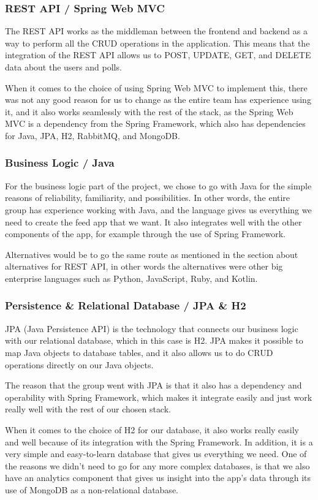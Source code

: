 \subsubsection{REST API / Spring Web MVC}
The REST API works as the middleman between the frontend and backend as a way to perform all the CRUD operations in the application. This means that the integration of the REST API allows us to POST, UPDATE, GET, and DELETE data about the users and polls.

When it comes to the choice of using Spring Web MVC to implement this, there was not any good reason for us to change as the entire team has experience using it, and it also works seamlessly with the rest of the stack, as the Spring Web MVC is a dependency from the Spring Framework, which also has dependencies for Java, JPA, H2, RabbitMQ, and MongoDB. 

\subsubsection{Business Logic / Java}
For the business logic part of the project, we chose to go with Java for the simple reasons of reliability, familiarity, and possibilities. In other words, the entire group has experience working with Java, and the language gives us everything we need to create the feed app that we want. It also integrates well with the other components of the app, for example through the use of Spring Framework.

Alternatives would be to go the same route as mentioned in the section about alternatives for REST API, in other words the alternatives were other big enterprise languages such as Python, JavaScript, Ruby, and Kotlin. 

\subsubsection{Persistence \& Relational Database / JPA \& H2}
JPA (Java Persistence API) is the technology that connects our business logic with our relational database, which in this case is H2. JPA makes it possible to map Java objects to database tables, and it also allows us to do CRUD operations directly on our Java objects. 

The reason that the group went with JPA is that it also has a dependency and operability with Spring Framework, which makes it integrate easily and just work really well with the rest of our chosen stack.

When it comes to the choice of H2 for our database, it also works really easily and well because of its integration with the Spring Framework. In addition, it is a very simple and easy-to-learn database that gives us everything we need. One of the reasons we didn't need to go for any more complex databases, is that we also have an analytics component that gives us insight into the app’s data through its use of MongoDB as a non-relational database.

